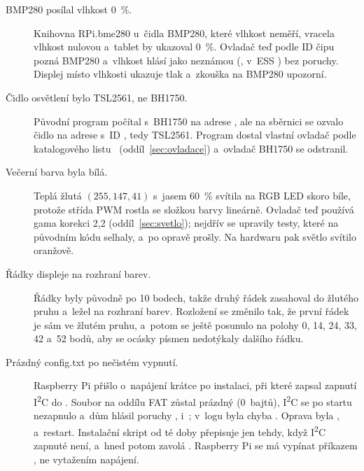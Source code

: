 \begin{description}
  \item[BMP280 posílal vlhkost 0~\%.] Knihovna RPi.bme280 u~čidla BMP280, které vlhkost neměří,
        vracela vlhkost nulovou a~tablet by ukazoval 0~\%. Ovladač teď podle ID čipu 
        pozná BMP280 a~vlhkost hlásí jako neznámou (, v~ESS ) bez
        poruchy. Displej místo vlhkosti ukazuje tlak a~zkouška  na BMP280
        upozorní.
  \item[Čidlo osvětlení bylo TSL2561, ne BH1750.] Původní program počítal s~BH1750 na adrese
        , ale na sběrnici se ozvalo čidlo na adrese  s~ID , tedy
        TSL2561. Program dostal vlastní ovladač podle katalogového listu~\cite{tsl2561}
        (oddíl~\ref{sec:ovladace}) a~ovladač BH1750 se odstranil.
  \item[Večerní barva byla bílá.] Teplá žlutá $(255, 147, 41)$ s~jasem 60~\% svítila na RGB LED
        skoro bíle, protože střída PWM rostla se složkou barvy lineárně. Ovladač teď používá gama
        korekci 2,2 (oddíl~\ref{sec:svetlo}); nejdřív se upravily testy, které na původním kódu
        selhaly, a~po opravě prošly. Na hardwaru pak světlo svítilo oranžově.
  \item[Řádky displeje na rozhraní barev.] Řádky byly původně po 10 bodech, takže druhý řádek
        zasahoval do žlutého pruhu a~ležel na rozhraní barev. Rozložení se změnilo tak, že první
        řádek je sám ve žlutém pruhu, a~potom se ještě posunulo na polohy 0, 14, 24, 33, 42
        a~52 bodů, aby se ocásky písmen nedotýkaly dalšího řádku.
  \item[Prázdný config.txt po nečistém vypnutí.] Raspberry Pi přišlo o~napájení krátce po
        instalaci, při které  zapsal zapnutí I\textsuperscript{2}C do
        . Soubor na oddílu FAT zůstal prázdný (0~bajtů),
        I\textsuperscript{2}C se po startu nezapnulo a~dům hlásil poruchy ,
         i~; v~logu byla chyba
        . Oprava byla
        ,  a~restart. Instalační skript od té
        doby přepisuje  jen tehdy, když I\textsuperscript{2}C zapnuté není,
        a~hned potom zavolá . Raspberry Pi se má vypínat příkazem
        , ne vytažením napájení.
\end{description}
